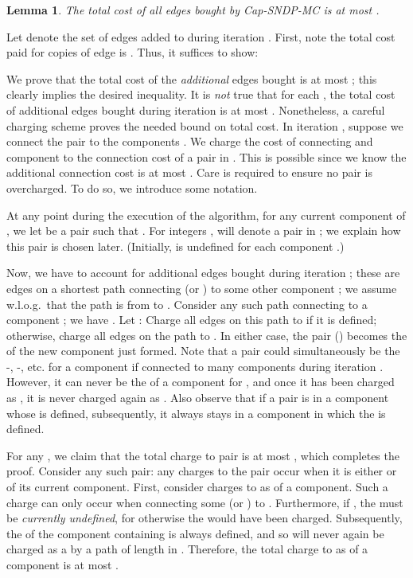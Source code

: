 \documentclass[11pt]{article}
\newcounter{thm0Rcopies}
\newcounter{thm_saved}
\newtheorem{lemma}{Lemma}[section]
\renewenvironment{proof}{\vspace{-0.1in}\noindent{\bf Proof:}}{\hspace*{\fill}\par}
\begin{document}
\begin{lemma}\label{lem:ellPays}
  The total cost of all edges bought by {\sc Cap-SNDP-MC} is at most
  .
\end{lemma}
\begin{proof}
  Let  denote the set of edges added to  during iteration
  . First, note the total cost paid for copies of edge 
  is . Thus, it suffices to show:
   

  We prove that the total cost of the \emph{additional} edges bought
  is at most ; this clearly implies the desired
  inequality. It is \emph{not} true that for each , the total cost
  of additional edges bought during iteration  is at most .  Nonetheless, a careful charging scheme proves the needed bound
  on total cost.  In iteration , suppose we connect the pair
   to the components . We charge the cost
  of connecting  and component  to the connection
  cost  of a pair  in . This is possible since
  we know the additional connection cost is at most
  . Care is required to ensure no pair is
  overcharged. To do so, we introduce some notation.


  At any point during the execution of the algorithm, for any current
  component  of , we let  be a pair  such that . For integers ,  will denote a pair  in ; we
  explain how this pair is chosen later. (Initially,  is
  undefined for each component .)

  Now, we have to account for additional edges bought during iteration
  ; these are edges on a shortest path connecting  (or )
  to some other component ; we assume w.l.o.g.~that the path is
  from  to . Consider any such path  connecting  to a
  component ; we have . Let : Charge all edges on this path to  if it is
  defined; otherwise, charge all edges on the path to . In
  either case, the pair () becomes the  of the new
  component just formed. Note that a pair  could
  simultaneously be the -, -, etc. for a
  component  if  connected to many components during
  iteration . However, it can never be the  of a
  component for , and once it has been charged as
  , it is never charged again as .  Also observe
  that if a pair is in a component  whose  is defined,
  subsequently, it always stays in a component in which the 
  is defined.

  \medskip
  For any , we claim that the total charge to pair  is
  at most , which completes the proof. Consider any such
  pair: any charges to the pair occur when it is either  or
   of its current component. First, consider charges to
   as  of a component. Such a charge can only
  occur when connecting some  (or ) to . Furthermore, if
  , the
   must be \emph{currently undefined}, for otherwise the
   would have been charged.  Subsequently, the 
  of the component containing  is always defined, and so
   will never again be charged as a  by a path
  of length in . Therefore, the total charge to  as  of a component is at most .


\end{proof}
\end{document}
